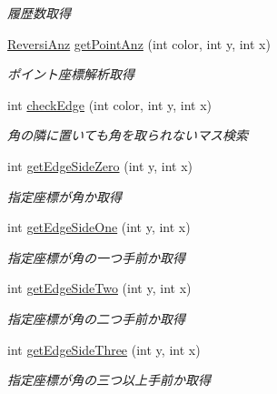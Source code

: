 \begin{DoxyCompactItemize}
\begin{DoxyCompactList}\small\item\em 履歴数取得 \end{DoxyCompactList}\item 
\mbox{\hyperlink{classjp_1_1gr_1_1java__conf_1_1yuta__yoshinaga_1_1reversi_1_1model_1_1_reversi_anz}{Reversi\+Anz}} \mbox{\hyperlink{classjp_1_1gr_1_1java__conf_1_1yuta__yoshinaga_1_1reversi_1_1model_1_1_reversi_a6da3f67c0468cf59ba6ceb796133c921}{get\+Point\+Anz}} (int color, int y, int x)
\begin{DoxyCompactList}\small\item\em ポイント座標解析取得 \end{DoxyCompactList}\item 
int \mbox{\hyperlink{classjp_1_1gr_1_1java__conf_1_1yuta__yoshinaga_1_1reversi_1_1model_1_1_reversi_a4874c6523adfdfd42dfbd625f5e3fe7a}{check\+Edge}} (int color, int y, int x)
\begin{DoxyCompactList}\small\item\em 角の隣に置いても角を取られないマス検索 \end{DoxyCompactList}\item 
int \mbox{\hyperlink{classjp_1_1gr_1_1java__conf_1_1yuta__yoshinaga_1_1reversi_1_1model_1_1_reversi_a3989b051544745724fc372d4a6b8a7f7}{get\+Edge\+Side\+Zero}} (int y, int x)
\begin{DoxyCompactList}\small\item\em 指定座標が角か取得 \end{DoxyCompactList}\item 
int \mbox{\hyperlink{classjp_1_1gr_1_1java__conf_1_1yuta__yoshinaga_1_1reversi_1_1model_1_1_reversi_aa3c701584a82e4656cb1c60123454953}{get\+Edge\+Side\+One}} (int y, int x)
\begin{DoxyCompactList}\small\item\em 指定座標が角の一つ手前か取得 \end{DoxyCompactList}\item 
int \mbox{\hyperlink{classjp_1_1gr_1_1java__conf_1_1yuta__yoshinaga_1_1reversi_1_1model_1_1_reversi_afc0b642f56e39a28ab5adc48c8fd2b98}{get\+Edge\+Side\+Two}} (int y, int x)
\begin{DoxyCompactList}\small\item\em 指定座標が角の二つ手前か取得 \end{DoxyCompactList}\item 
int \mbox{\hyperlink{classjp_1_1gr_1_1java__conf_1_1yuta__yoshinaga_1_1reversi_1_1model_1_1_reversi_a296b35d2241e6b3cff31bcb199c3d9aa}{get\+Edge\+Side\+Three}} (int y, int x)
\begin{DoxyCompactList}\small\item\em 指定座標が角の三つ以上手前か取得 \end{DoxyCompactList}\end{DoxyCompactItemize}
